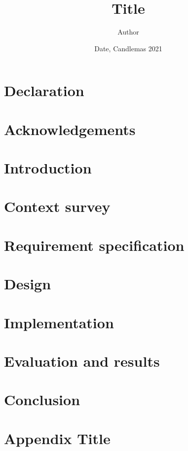 \documentclass{thesis}
\title{Title}
\author{Author}
\date{Date, Candlemas 2021}
\begin{document}
  

  

  \chapter*{Declaration}
  

  \chapter*{Acknowledgements}
  

  \tableofcontents

  \listoffigures

  \listoftables

  \chapter{Introduction}
  

  \chapter{Context survey}
  

  \chapter{Requirement specification}
  

  \chapter{Design}
  

  \chapter{Implementation}
  

  \chapter{Evaluation and results}
  

  \chapter{Conclusion}
  

  \appendix
  \chapter{Appendix Title}
  

  \printbibliography
\end{document}
